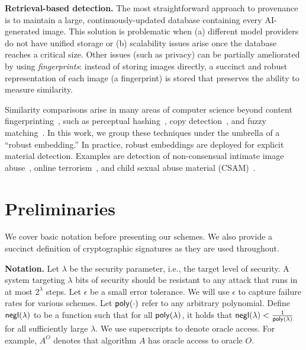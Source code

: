 \documentclass[12pt]{article}
\begin{document}
\textbf{Retrieval-based detection.} 
The most straightforward approach to provenance is to maintain a large, continuously-updated database containing every AI-generated image.
This solution is problematic when (a) different model providers do not have unified storage or (b) scalability issues arise once the database reaches a critical size.
Other issues (such as privacy) can be partially ameliorated by using \textit{fingerprints}: instead of storing images directly, a succinct and robust representation of each image (a fingerprint) is stored that preserves the ability to measure similarity.

Similarity comparisons arise in many areas of computer science beyond content fingerprinting~\citep{seo2004robust}, such as perceptual hashing~\citep{indyk1998approximate}, copy detection~\citep{chen2020simple}, and fuzzy matching~\citep{chaudhuri2003robust}.
In this work, we group these techniques under the umbrella of a ``robust embedding.''
In practice, robust embeddings are deployed for explicit material detection.
Examples are detection of non-consensual intimate image abuse~\citep{stopncii}, online terrorism~\citep{saltman2021practical}, and child sexual abuse material (CSAM)~\citep{apple2021csam,prokos2023squint}.

\section{Preliminaries}

We cover basic notation before presenting our schemes.
We also provide a succinct definition of cryptographic signatures as they are used throughout.

\textbf{Notation.}
Let $\lambda$ be the security parameter, i.e., the target level of security.
A system targeting $\lambda$ bits of security should be resistant to any attack that runs in at most $2^\lambda$ steps.
Let $\epsilon$ be a small error tolerance.
We will use $\epsilon$ to capture failure rates for various schemes.
Let $\mathsf{poly}(\cdot)$ refer to any arbitrary polynomial. 
Define $\mathsf{negl}(\lambda)$ to be a function such that for all $\mathsf{poly}(\lambda)$, it holds that $\mathsf{negl}(\lambda) < \frac{1}{\mathsf{poly}(\lambda)}$ for all sufficiently large $\lambda$.
We use superscripts to denote oracle access. For example, $A^O$ denotes that algorithm $A$ has oracle access to oracle $O$.
\end{document}
